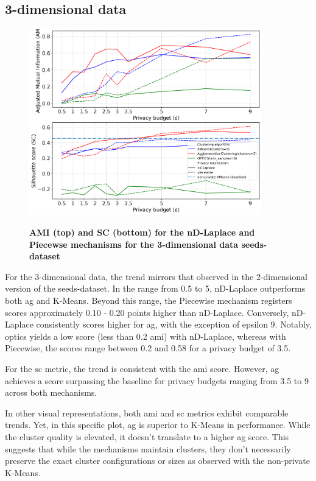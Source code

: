\subsection{3-dimensional data}
\begin{figure}[H]
  \centering
  \caption{\textbf{AMI (top) and SC (bottom) for the nD-Laplace and Piecewse mechanisms for the 3-dimensional data seeds-dataset}}
  \includegraphics[width=0.9\textwidth]{Results/nd-laplace/nd-Laplace/seeds-dataset/ami-and-sc_3_dimensions.png}
  \label{fig:validation-seeds-dataset_comparison_3d-laplace}
\end{figure}
For the 3-dimensional data, the trend mirrors that observed in the 2-dimensional version of the seeds-dataset. In the range from 0.5 to 5, nD-Laplace outperforms both \gls{ag} and K-Means. Beyond this range, the Piecewise mechanism registers scores approximately 0.10 - 0.20 points higher than nD-Laplace. Conversely, nD-Laplace consistently scores higher for \gls{ag}, with the exception of epsilon 9. Notably, \gls{optics} yields a low score (less than 0.2 \gls{ami}) with nD-Laplace, whereas with Piecewise, the scores range between 0.2 and 0.58 for a privacy budget of 3.5.

For the \gls{sc} metric, the trend is consistent with the \gls{ami} score. However, \gls{ag} achieves a score surpassing the baseline for privacy budgets ranging from 3.5 to 9 across both mechanisms.

In other visual representations, both \gls{ami} and \gls{sc} metrics exhibit comparable trends. Yet, in this specific plot, \gls{ag} is superior to K-Means in performance. While the cluster quality is elevated, it doesn't translate to a higher \gls{ag} score. This suggests that while the mechanisms maintain clusters, they don't necessarily preserve the exact cluster configurations or sizes as observed with the non-private K-Means.

